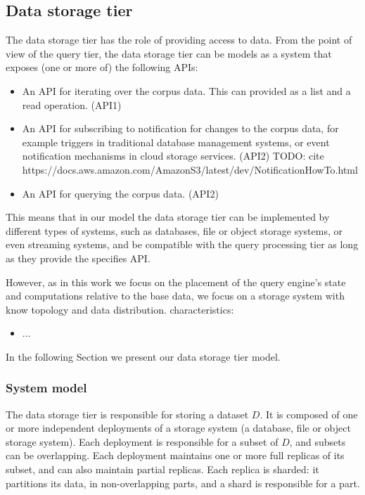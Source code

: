 \subsection{Data storage tier}
The data storage tier has the role of providing access to data.
From the point of view of the query tier, the data storage tier can be models as a system that exposes (one or more of)
the following APIs:
\begin{itemize}
\item An API for iterating over the corpus data. This can provided as a list and a read operation. (API1)
\item An API for subscribing to notification for changes to the corpus data, for example triggers in traditional
database management systems, or event notification mechanisms in cloud storage services. (API2)
TODO: cite https://docs.aws.amazon.com/AmazonS3/latest/dev/NotificationHowTo.html
\item An API for querying the corpus data. (API2)
\end{itemize}

This means that in our model the data storage tier can be implemented by different types of systems, such as databases,
file or object storage systems, or even streaming systems, and be compatible with the query processing tier as long as
they provide the specifies API.

However, as in this work we focus on the placement of the query engine's state and computations relative to the base data,
we focus on a storage system with know topology and data distribution.
characteristics:
\begin{itemize}
\item ...
\end{itemize}

In the following Section we present our data storage tier model.



\subsubsection{System model}
The data storage tier is responsible for storing a dataset $D$.
It is composed of one or more independent deployments of a storage system (a database, file or object storage system).
Each deployment is responsible for a subset of $D$, and subsets can be overlapping.
Each deployment maintains one or more full replicas of its subset, and can also maintain partial replicas.
Each replica is sharded: it partitions its data, in non-overlapping parts, and a shard is responsible for a part.

